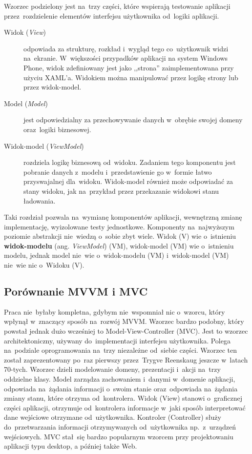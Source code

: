 \documentclass[a4paper,twoside,titlepage,openright]{book}
\begin{document}
Wzorzec podzielony jest na~trzy części, które wspierają testowanie aplikacji przez~rozdzielenie elementów interfejsu użytkownika od~logiki aplikacji.
\begin{description}

	\item[Widok (\textit{View})] odpowiada za strukturę, rozkład i~wygląd tego co~użytkownik widzi na~ekranie. W~większości przypadków aplikacji na system Windows Phone, widok zdefiniowany jest jako ,,strona'' zaimplementowana przy użyciu XAML’a. Widokiem można manipulować przez logikę strony lub przez widok-model.
	
	\item[Model (\textit{Model})] jest odpowiedzialny za przechowywanie danych w~obrębie swojej domeny oraz~logiki biznesowej.
	
	\item[Widok-model (\textit{ViewModel})] rozdziela logikę biznesową od~widoku. Zadaniem tego komponentu jest pobranie danych z~modelu i~przedstawienie go w~formie łatwo przyswajalnej dla~widoku. Widok-model również może odpowiadać za stany widoku, jak na~przykład przez przekazanie widokowi stanu ładowania.

\end{description}

Taki rozdział pozwala na~wymianę komponentów aplikacji, wewnętrzną zmianę implementację, wyizolowane testy jednostkowe. Komponenty na~najwyższym poziomie abstrakcji nie~wiedzą o~sobie zbyt wiele. Widok (V) wie o~istnieniu \textbf{widok-modelu} (ang. \textit{ViewModel}) (VM), widok-model (VM) wie o~istnieniu modelu, jednak model nie~wie o~widok-modelu (VM) i~widok-model (VM) nie~wie nic o~Widoku (V).



\subsection{Porównanie MVVM i MVC}

Praca nie~byłaby kompletna, gdybym nie~wspomniał nic o~wzorcu, który wpłynął w~znaczący sposób na~rozwój MVVM. Wzorzec bardzo podobny, który powstał jednak dużo wcześniej to Model-View-Controller (MVC). Jest to wzorzec architektoniczny, używany do~implementacji interfejsu użytkownika. Polega na~podziale oprogramowania na~trzy niezależne od~siebie części. Wzorzec ten został zaprezentowany po~raz pierwszy przez~Trygve Reenskaug jeszcze w~latach 70-tych.\cite{mvcXerox} Wzorzec dzieli modelowanie domeny, prezentacji i~akcji na~trzy oddzielne klasy. Model zarządza zachowaniem i~danymi w~domenie aplikacji, odpowiada na~żądania informacji o~swoim stanie oraz~odpowiada na~żądania zmiany stanu, które otrzyma od~kontrolera. Widok (View) stanowi o~graficznej części aplikacji, otrzymuje od~kontrolera informacje w~jaki sposób interpretować dane wejściowe otrzymane od~użytkownika. Kontroler (Controller) służy do~przetwarzania informacji otrzymywanych od~użytkownika np.~z~urządzeń wejściowych. MVC stał~się bardzo popularnym wzorcem przy projektowaniu aplikacji typu desktop, a później także Web. 
\end{document}
